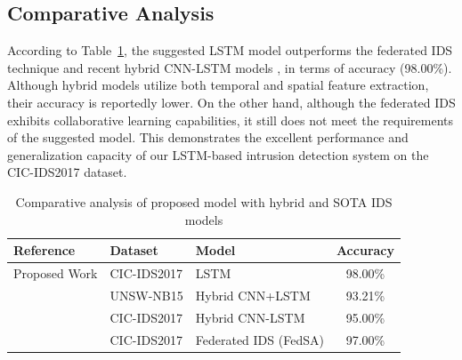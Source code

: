 \documentclass[conference]{IEEEtran}
\begin{document}
\vspace{-3mm}
\subsection{Comparative Analysis}


According to Table~\ref{tab:benchmark_comparison}, the suggested LSTM model outperforms the federated IDS technique \cite{neto2022fedsa} and recent hybrid CNN-LSTM models \cite{altunay2023hybrid}, \cite{bamber2025hybrid} in terms of accuracy (98.00\%).  Although hybrid models utilize both temporal and spatial feature extraction, their accuracy is reportedly lower.  On the other hand, although the federated IDS exhibits collaborative learning capabilities, it still does not meet the requirements of the suggested model.  This demonstrates the excellent performance and generalization capacity of our LSTM-based intrusion detection system on the CIC-IDS2017 dataset. 

\begin{table}[h!]
\centering
\caption{Comparative analysis of proposed model with hybrid and SOTA IDS models}
\begin{tabular}{|l|l|l|c|}
\hline
\textbf{Reference} & \textbf{Dataset} & \textbf{Model} & \textbf{Accuracy} \\ \hline
Proposed Work & CIC-IDS2017 & LSTM & 98.00\% \\ \hline
\cite{altunay2023hybrid} & UNSW-NB15 & Hybrid CNN+LSTM & 93.21\% \\ \hline
\cite{bamber2025hybrid} & CIC-IDS2017 & Hybrid CNN-LSTM & 95.00\% \\ \hline
\cite{neto2022fedsa} & CIC-IDS2017 & Federated IDS (FedSA) & 97.00\% \\ \hline
\end{tabular}
\label{tab:benchmark_comparison}
\end{table}


\vspace{-2mm}
\end{document}

